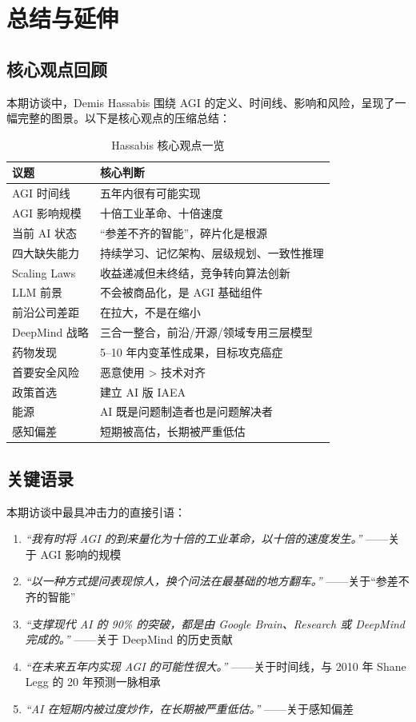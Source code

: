 \section{总结与延伸}

\subsection{核心观点回顾}

本期访谈中，Demis Hassabis 围绕 AGI 的定义、时间线、影响和风险，呈现了一幅完整的图景。以下是核心观点的压缩总结：

\begin{table}[H]
\centering
\begin{tabular}{p{} p{}}
\toprule
\textbf{议题} & \textbf{核心判断} \\
\midrule
AGI 时间线 & 五年内很有可能实现 \\
AGI 影响规模 & 十倍工业革命、十倍速度 \\
当前 AI 状态 & ``参差不齐的智能''，碎片化是根源 \\
四大缺失能力 & 持续学习、记忆架构、层级规划、一致性推理 \\
Scaling Laws & 收益递减但未终结，竞争转向算法创新 \\
LLM 前景 & 不会被商品化，是 AGI 基础组件 \\
前沿公司差距 & 在拉大，不是在缩小 \\
DeepMind 战略 & 三合一整合，前沿/开源/领域专用三层模型 \\
药物发现 & 5--10 年内变革性成果，目标攻克癌症 \\
首要安全风险 & 恶意使用 > 技术对齐 \\
政策首选 & 建立 AI 版 IAEA \\
能源 & AI 既是问题制造者也是问题解决者 \\
感知偏差 & 短期被高估，长期被严重低估 \\
\bottomrule
\end{tabular}
\caption{Hassabis 核心观点一览}
\end{table}

\subsection{关键语录}

本期访谈中最具冲击力的直接引语：

\begin{enumerate}
    \item \textit{``我有时将 AGI 的到来量化为十倍的工业革命，以十倍的速度发生。''} ——关于 AGI 影响的规模
    \item \textit{``以一种方式提问表现惊人，换个问法在最基础的地方翻车。''} ——关于``参差不齐的智能''
    \item \textit{``支撑现代 AI 的 90\% 的突破，都是由 Google Brain、Research 或 DeepMind 完成的。''} ——关于 DeepMind 的历史贡献
    \item \textit{``在未来五年内实现 AGI 的可能性很大。''} ——关于时间线，与 2010 年 Shane Legg 的 20 年预测一脉相承
    \item \textit{``AI 在短期内被过度炒作，在长期被严重低估。''} ——关于感知偏差
\end{enumerate}

